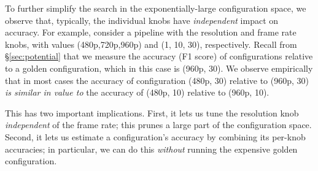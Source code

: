 

To further simplify the search in the exponentially-large configuration space, we observe that, typically, the individual knobs have \emph{independent} impact on accuracy. For example, consider a pipeline with the resolution and frame rate knobs, with values (480p,720p,960p) and (1, 10, 30), respectively. Recall from \S\ref{sec:potential} that we measure the accuracy (F1 score) of configurations relative to a golden configuration, which in this case is (960p, 30).  We observe empirically that in most cases the accuracy of configuration (480p, 30) relative to (960p, 30) {\em is similar in value to} the accuracy of (480p, 10) relative to (960p, 10). %

This has two important implications.  First, it lets us tune the resolution knob {\em independent} of the frame rate; this prunes a large part of the configuration space. Second, it lets us estimate a configuration's accuracy by combining its per-knob accuracies; in particular, we can do this {\em without} running the expensive golden configuration. 


